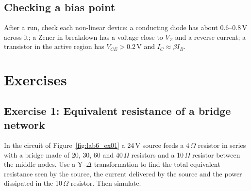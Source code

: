 \subsection{Checking a bias point}
After a  run, check each non-linear device: a conducting diode has about 0.6--0.8\,V across it; a Zener in breakdown has a voltage close to $V_Z$ and a reverse current; a transistor in the active region has $V_{CE}>0.2$\,V and $I_C\approx\beta I_B$.

\section{Exercises}

\subsection{Exercise 1: Equivalent resistance of a bridge network}
In the circuit of Figure~\ref{fig:lab6_ex01} a 24\,V source feeds a 4\,$\Omega$ resistor in series with a bridge made of 20, 30, 60 and 40\,$\Omega$ resistors and a 10\,$\Omega$ resistor between the middle nodes. Use a Y--$\Delta$ transformation to find the total equivalent resistance seen by the source, the current delivered by the source and the power dissipated in the 10\,$\Omega$ resistor. Then simulate.





